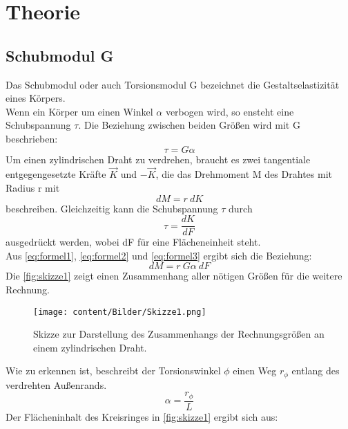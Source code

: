 \section{Theorie}
\label{sec:Theorie}

\subsection{Schubmodul G}
Das Schubmodul oder auch Torsionsmodul G bezeichnet die Gestaltselastizität eines Körpers.\\
Wenn ein Körper um einen Winkel \(\alpha\) verbogen wird, so ensteht eine Schubspannung \(\tau\).
Die Beziehung zwischen beiden Größen wird mit G beschrieben:
\begin{equation}
    \tau = G\alpha
    \label{eq:formel1}
\end{equation}
Um einen zylindrischen Draht zu verdrehen, braucht es zwei tangentiale entgegengesetzte Kräfte \(\vec{K}\) und \(-\vec{K}\), die das Drehmoment M des Drahtes mit Radius r mit
\begin{equation}
    dM = r \ dK
    \label{eq:formel2}
\end{equation}
beschreiben. 
Gleichzeitig kann die Schubspannung \(\tau\) durch
\begin{equation}
    \tau = \frac{dK}{dF}
    \label{eq:formel3}
\end{equation}
ausgedrückt werden, wobei dF für eine Flächeneinheit steht.\\
Aus \autoref{eq:formel1}, \autoref{eq:formel2} und \autoref{eq:formel3} ergibt sich die Beziehung:
\begin{equation}
    dM = r \ G\alpha \ dF
    \label{eq:formel4}
\end{equation}
\newpage
Die \autoref{fig:skizze1} zeigt einen Zusammenhang aller nötigen Größen für die weitere Rechnung.\\
\begin{figure}
    \centering
    \texttt{[image: content/Bilder/Skizze1.png]}
    \caption{Skizze zur Darstellung des Zusammenhangs der Rechnungsgrößen an einem zylindrischen Draht.}
    \label{fig:skizze1}
\end{figure}
Wie zu erkennen ist, beschreibt der Torsionswinkel \(\phi\) einen Weg \(r_{\phi}\) entlang des verdrehten Außenrands.
\begin{equation}
    \alpha = \frac{r_{\phi}}{L}
    \label{eq:formel5}
\end{equation}
Der Flächeninhalt des Kreisringes in \autoref{fig:skizze1} ergibt sich aus:
